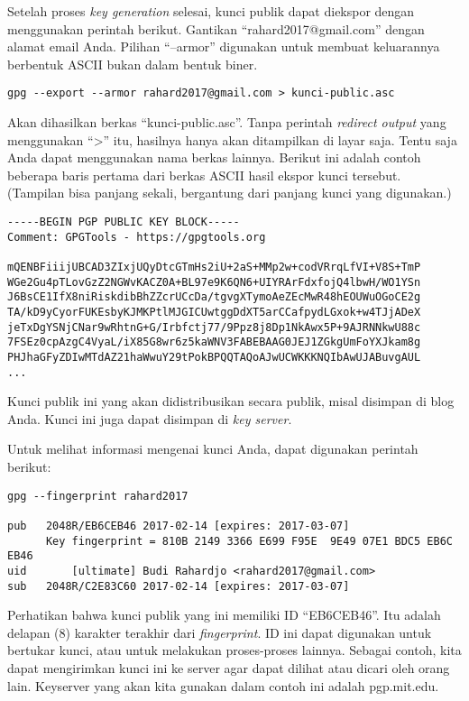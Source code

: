 Setelah proses {\em key generation} selesai, kunci publik dapat diekspor dengan
menggunakan perintah  berikut. Gantikan ``rahard2017@gmail.com'' dengan alamat
email Anda. Pilihan ``--armor'' digunakan untuk membuat keluarannya berbentuk ASCII
bukan dalam bentuk biner.

\begin{verbatim}
gpg --export --armor rahard2017@gmail.com > kunci-public.asc
\end{verbatim}

Akan dihasilkan berkas ``kunci-public.asc''. Tanpa perintah {\em redirect
output} yang menggunakan ``>'' itu, hasilnya hanya akan ditampilkan di layar
saja. Tentu saja Anda dapat menggunakan nama berkas lainnya.
Berikut ini adalah contoh beberapa baris pertama dari berkas ASCII hasil ekspor
kunci tersebut. (Tampilan bisa panjang sekali, bergantung dari panjang kunci
yang digunakan.)

\begin{verbatim}
-----BEGIN PGP PUBLIC KEY BLOCK-----
Comment: GPGTools - https://gpgtools.org

mQENBFiiijUBCAD3ZIxjUQyDtcGTmHs2iU+2aS+MMp2w+codVRrqLfVI+V8S+TmP
WGe2Gu4pTLovGzZ2NGWvKACZ0A+BL97e9K6QN6+UIYRArFdxfojQ4lbwH/WO1YSn
J6BsCE1IfX8niRiskdibBhZZcrUCcDa/tgvgXTymoAeZEcMwR48hEOUWuOGoCE2g
TA/kD9yCyorFUKEsbyKJMKPtlMJGICUwtggDdXT5arCCafpydLGxok+w4TJjADeX
jeTxDgYSNjCNar9wRhtnG+G/Irbfctj77/9Ppz8j8Dp1NkAwx5P+9AJRNNkwU88c
7FSEz0cpAzgC4VyaL/iX85G8wr6z5kaWNV3FABEBAAG0JEJ1ZGkgUmFoYXJkam8g
PHJhaGFyZDIwMTdAZ21haWwuY29tPokBPQQTAQoAJwUCWKKKNQIbAwUJABuvgAUL
...
\end{verbatim}

Kunci publik ini yang akan didistribusikan secara publik, misal disimpan di
blog Anda. Kunci ini juga dapat disimpan di {\em key server}.

Untuk melihat informasi mengenai kunci Anda, dapat digunakan perintah berikut:

\begin{verbatim}
gpg --fingerprint rahard2017

pub   2048R/EB6CEB46 2017-02-14 [expires: 2017-03-07]
      Key fingerprint = 810B 2149 3366 E699 F95E  9E49 07E1 BDC5 EB6C EB46
uid       [ultimate] Budi Rahardjo <rahard2017@gmail.com>
sub   2048R/C2E83C60 2017-02-14 [expires: 2017-03-07]
\end{verbatim}

Perhatikan bahwa kunci publik yang ini memiliki ID ``EB6CEB46''. 
Itu adalah delapan (8) karakter terakhir dari {\em fingerprint}.
ID ini dapat
digunakan untuk bertukar kunci, atau untuk melakukan proses-proses lainnya.
Sebagai contoh, kita dapat mengirimkan kunci ini ke server agar dapat dilihat
atau dicari oleh orang lain. Keyserver yang akan kita gunakan dalam contoh ini
adalah pgp.mit.edu.

